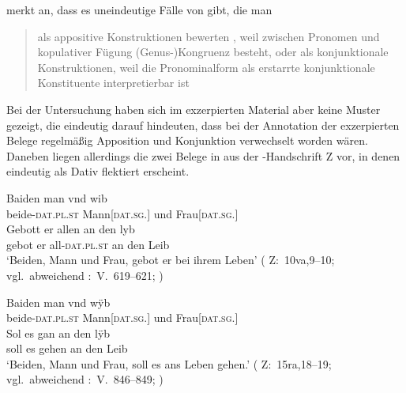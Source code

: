 \citet{gjelsten1980} merkt an, dass es uneindeutige Fälle von  gibt, die man \blockcquote[187]{gjelsten1980}{als appositive
Konstruktionen bewerten , weil zwischen Pronomen und kopulativer
Fügung (Genus-)Kongruenz besteht, oder als konjunktionale Konstruktionen, weil
die Pronominalform als erstarrte konjunktionale Konstituente interpretierbar
ist}. Bei der Untersuchung haben sich im exzerpierten Material aber keine
Muster gezeigt, die eindeutig darauf hindeuten, dass bei der Annotation der
exzerpierten Belege regelmäßig Apposition und Konjunktion verwechselt worden
wären. Daneben liegen allerdings die zwei Belege in 
aus der \KC{}-Handschrift Z vor, in denen  eindeutig als Dativ
flektiert erscheint.

\begin{exe}
\ex \label{ex:kczbeidenundesynt1}
\begin{xlist}
	\ex \label{ex:kczbeidenundesynt1_1}
		\gll Baiden man vnd wib \\
			beide-\textsc{dat.pl\subMF.st} Mann[\textsc{dat.sg.\MascM}] und
				Frau[\textsc{dat.sg.\NeutF}] \\
	\sn \gll Gebott er allen an den lyb \\
			gebot er all-\textsc{dat.pl\subMF.st} an den Leib \\
		\trans `Beiden, Mann und Frau, gebot er bei ihrem Leben'
			(%
				Z:~10va,9--10; vgl.~abweichend
				\KC:~V.~619--621;
				\cite[92]{schroeder1895}%
			)

\ex \label{ex:kczbeidenundesynt1_2}
	\gll Baiden man vnd wÿb \\
			beide-\textsc{dat.pl\subMF.st} Mann[\textsc{dat.sg.\MascM}] und
				Frau[\textsc{dat.sg.\NeutF}] \\
	\sn \gll Sol es gan an den lÿb \\
			soll es gehen an den Leib \\
		\trans `Beiden, Mann und Frau, soll es ans Leben gehen.'
			(%
				Z:~15ra,18--19; vgl.~abweichend
				\KC:~V.~846--849;
				\cite[97]{schroeder1895}%
			)
\end{xlist}
\end{exe}

